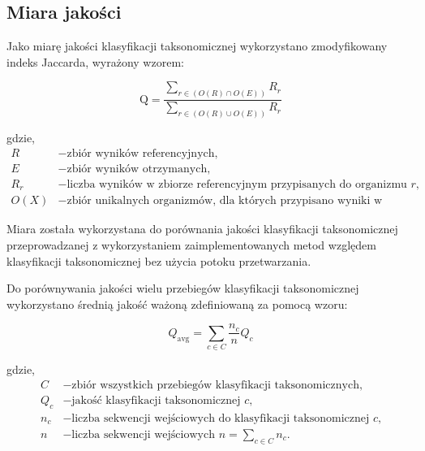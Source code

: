     \subsection{Miara jakości}

        Jako miarę jakości klasyfikacji taksonomicznej wykorzystano zmodyfikowany indeks Jaccarda, wyrażony wzorem:

        \begin{equation}
            \text{Q} = \frac{
                \sum_{r \in (O(R) \cap O(E))} R_{r}
            }{
                \sum_{r \in (O(R) \cup O(E))} R_{r}
            }
            \label{Equation:Quality}
        \end{equation}

        gdzie,
        \begin{align*}
            R &- \text{zbiór wyników referencyjnych,} \\
            E &- \text{zbiór wyników otrzymanych,} \\
            R_{r} &- \text{liczba wyników w zbiorze referencyjnym przypisanych do organizmu $r$,} \\
            O(X) &- \text{zbiór unikalnych organizmów, dla których przypisano wyniki w zbiorze X. }
        \end{align*}

        Miara została wykorzystana do porównania jakości klasyfikacji taksonomicznej przeprowadzanej z wykorzystaniem zaimplementowanych metod względem klasyfikacji taksonomicznej bez użycia potoku przetwarzania.

        Do porównywania jakości wielu przebiegów klasyfikacji taksonomicznej wykorzystano średnią jakość ważoną zdefiniowaną za pomocą wzoru:


        \begin{equation}
            Q_{\text{avg}} = \sum_{c \in C} \frac{n_c}{n} Q_c
            \label{Equation:WeightedAverageQuality}
        \end{equation}

        gdzie,
        \begin{align*}
          C &- \text{zbiór wszystkich przebiegów klasyfikacji taksonomicznych,} \\
          Q_c &- \text{jakość klasyfikacji taksonomicznej $c$,} \\
          n_c &- \text{liczba sekwencji wejściowych do klasyfikacji taksonomicznej $c$,}\\
          n   &- \text{liczba sekwencji wejściowych $n = \sum_{c \in C} n_{c}.$}
        \end{align*}

